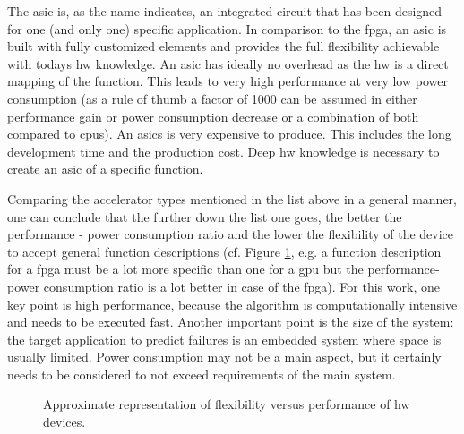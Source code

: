 \documentclass[mscthesis]{usiinfthesis}
\begin{document}
\begin{description}
        The \acrfull{asic} is, as the name indicates, an integrated circuit
        that has been designed for one (and only one) specific application. In
        comparison to the \gls{fpga}, an \gls{asic} is built with fully
        customized elements and provides the full flexibility achievable with
        todays \gls{hw} knowledge. An \gls{asic} has ideally no overhead as the
        \gls{hw} is a direct mapping of the function. This leads to very high
        performance at very low power consumption (as a rule of thumb a factor
        of 1000 can be assumed in either performance gain or power consumption
        decrease or a combination of both compared to \glspl{cpu}).  An
        \glspl{asic} is very expensive to produce. This includes the long
        development time and the production cost. Deep \gls{hw} knowledge is
        necessary to create an \gls{asic} of a specific function.
\end{description}

Comparing the accelerator types mentioned in the list above in a general
manner, one can conclude that the further down the list one goes, the better
the performance - power consumption ratio and the lower the flexibility of the
device to accept general function descriptions (cf. Figure \ref{fig:hw}, e.g.
a function description for a \gls{fpga} must be a lot more specific than one
for a \gls{gpu} but the performance-power consumption ratio is a lot better in
case of the \gls{fpga}). For this work, one key point is high performance,
because the algorithm is computationally intensive and needs to be executed
fast. Another important point is the size of the system: the target application
to predict failures is an embedded system where space is usually limited.
Power consumption may not be a main aspect, but it certainly needs to be
considered to not exceed requirements of the main system.

\begin{figure}
    \centering
    
    \caption{Approximate representation of flexibility versus performance of
        \acrshort{hw} devices.}
    \label{fig:hw}
\end{figure}
\end{document}
